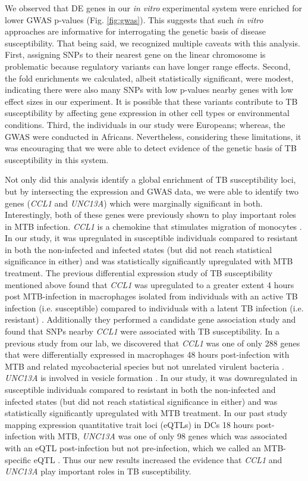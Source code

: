 We observed that DE genes in our \emph{in vitro} experimental system
were enriched for lower GWAS p-values (Fig. \ref{fig:gwas}). This
suggests that such \emph{in vitro} approaches are informative for
interrogating the genetic basis of disease susceptibility. That being
said, we recognized multiple caveats with this analysis. First,
assigning SNPs to their nearest gene on the linear chromosome is
problematic because regulatory variants can have longer range effects.
Second, the fold enrichments we calculated, albeit statistically
significant, were modest, indicating there were also many SNPs with
low p-values nearby genes with low effect sizes in our experiment. It
is possible that these variants contribute to TB susceptibility by
affecting gene expression in other cell types or environmental
conditions. Third, the individuals in our study were Europeans;
whereas, the GWAS were conducted in Africans. Nevertheless,
considering these limitations, it was encouraging that we were able to
detect evidence of the genetic basis of TB susceptibility in this
system.

Not only did this analysis identify a global enrichment of TB
susceptibility loci, but by intersecting the expression and GWAS data,
we were able to identify two genes (\emph{CCL1} and \emph{UNC13A})
which were marginally significant in both. Interestingly, both of
these genes were previously shown to play important roles in MTB
infection. \emph{CCL1} is a chemokine that stimulates migration of
monocytes \citep{Miller1992}. In our study, it was upregulated in
susceptible individuals compared to resistant in both the non-infected
and infected states (but did not reach statistical significance in
either) and was statistically significantly upregulated with MTB
treatment. The previous differential expression study of TB
susceptibility mentioned above found that \emph{CCL1} was upregulated
to a greater extent 4 hours post MTB-infection in macrophages isolated
from individuals with an active TB infection (i.e. susceptible)
compared to individuals with a latent TB infection (i.e. resistant)
\citep{Thuong2008}. Additionally they performed a candidate gene
association study and found that SNPs nearby \emph{CCL1} were
associated with TB susceptibility. In a previous study from our lab,
we discovered that \emph{CCL1} was one of only 288 genes that were
differentially expressed in macrophages 48 hours post-infection with
MTB and related mycobacterial species but not unrelated virulent
bacteria \citep{Blischak2015}. \emph{UNC13A} is involved in vesicle
formation \citep{Sudhof2004}. In our study, it was downregulated in
susceptible individuals compared to resistant in both the non-infected
and infected states (but did not reach statistical significance in
either) and was statistically significantly upregulated with MTB
treatment. In our past study mapping expression quantitative trait
loci (eQTLs) in DCs 18 hours post-infection with MTB, \emph{UNC13A}
was one of only 98 genes which was associated with an eQTL
post-infection but not pre-infection, which we called an MTB-specific
eQTL \citep{Barreiro2012}. Thus our new results increased the evidence
that \emph{CCL1} and \emph{UNC13A} play important roles in TB
susceptibility.

